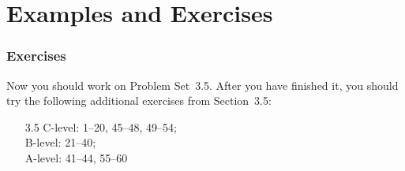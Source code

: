 \documentclass[serif,ignorenonframetext]{beamer}
\begin{document}
\section{Examples and Exercises}


\begin{frame}
  \frametitle{Exercises}
  Now you should work on Problem Set~3.5.  After you have finished it,
  you should try the following additional exercises from Section~3.5:
  \begin{itemize}
  \item[3.5]
    C-level: 1--20, 45--48, 49--54; \\
    B-level: 21--40; \\
    A-level: 41--44, 55--60
  \end{itemize}
\end{frame}
\end{document}
